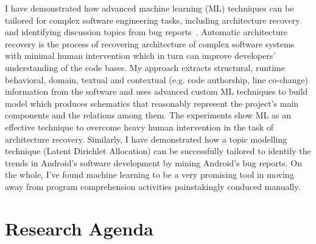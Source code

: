 \documentclass[a4paper]{article}
\begin{document}


I have demonstrated how advanced machine learning (ML) techniques can be tailored for complex software engineering tasks, including architecture recovery~\cite{archrecoveryicpc, archrecoveryisec} and identifying discussion topics from bug reports~\cite{topicmodelling}. 
Automatic architecture recovery is the process of recovering architecture of complex software systems with minimal human intervention which in turn can
improve developers’ understanding of the code bases. My approach extracts structural, runtime behavioral, domain, textual and contextual (e.g. code
authorship, line co-change) information from the software and uses advanced custom ML techniques to build model which produces schematics that reasonably represent the
project’s main components and the relations among them. 
The experiments show ML as an effective technique to overcome heavy human intervention in the task of architecture recovery.  Similarly, I have demonstrated how a topic modelling technique (Latent Dirichlet Allocation) can be successfully tailored to identify the 
trends in Android’s software development by mining Android’s bug reports. On the whole, I've found machine learning to be a very promising tool in moving away from program comprehension activities painstakingly conduced manually.

\section*{Research Agenda}
\end{document}
